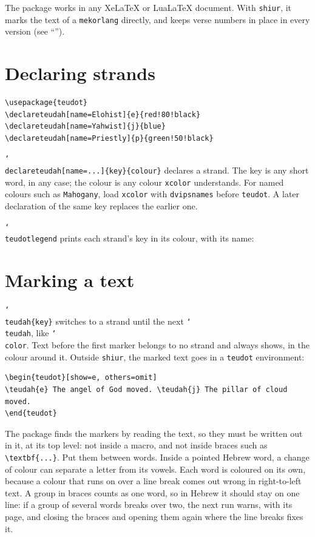 \documentclass[11pt]{article}
\newcommand{\cs}[1]{\texttt{\char`\\#1}}
\begin{document}
The package works in any XeLaTeX or LuaLaTeX document. With \texttt{shiur}, it marks the text
of a \texttt{mekorlang} directly, and keeps verse numbers in place in every version (see
``'').

\section{Declaring strands}

\begin{Verbatim}
\usepackage{teudot}
\declareteudah[name=Elohist]{e}{red!80!black}
\declareteudah[name=Yahwist]{j}{blue}
\declareteudah[name=Priestly]{p}{green!50!black}
\end{Verbatim}
\cs{declareteudah}\verb|[name=...]{key}{colour}| declares a strand. The key is any short word,
in any case; the colour is any colour \texttt{xcolor} understands. For named colours such as
\texttt{Mahogany}, load \texttt{xcolor} with \texttt{dvipsnames} before \texttt{teudot}. A later
declaration of the same key replaces the earlier one.

\cs{teudotlegend} prints each strand's key in its colour, with its name:
\begin{center}
\teudotlegend
\end{center}

\section{Marking a text}

\cs{teudah}\verb|{key}| switches to a strand until the next \cs{teudah}, like \cs{color}. Text
before the first marker belongs to no strand and always shows, in the colour around it.
Outside \texttt{shiur}, the marked text goes in a \texttt{teudot} environment:
\begin{Verbatim}
\begin{teudot}[show=e, others=omit]
\teudah{e} The angel of God moved. \teudah{j} The pillar of cloud moved.
\end{teudot}
\end{Verbatim}
The package finds the markers by reading the text, so they must be written out in it, at its
top level: not inside a macro, and not inside braces such as \verb|\textbf{...}|. Put them
between words. Inside a pointed Hebrew word, a change of colour can separate a letter from its
vowels. Each word is coloured on its own, because a colour that runs on over a line break comes
out wrong in right-to-left text. A group in braces counts as one word, so in Hebrew it should
stay on one line: if a group of several words breaks over two, the next run warns, with its
page, and closing the braces and opening them again where the line breaks fixes it.
\end{document}
